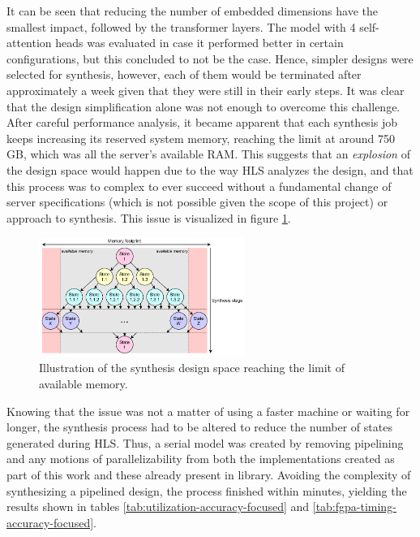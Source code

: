 It can be seen that reducing the number of embedded dimensions have the smallest impact, followed by the transformer layers. The model with 4 self-attention heads was evaluated in case it performed better in certain configurations, but this concluded to not be the case. Hence, simpler designs were selected for synthesis, however, each of them would be terminated after approximately a week given that they were still in their early steps. It was clear that the design simplification alone was not enough to overcome this challenge. After careful performance analysis, it became apparent that each synthesis job keeps increasing its reserved system memory, reaching the limit at around 750 GB, which was all the server's available RAM. This suggests that an \textit{explosion} of the design space would happen due to the way HLS analyzes the design, and that this process was to complex to ever succeed without a fundamental change of server specifications (which is not possible given the scope of this project) or approach to synthesis. This issue is visualized in figure \ref{fig:state-space-explosion}. 

\begin{figure}[hpt!]
  \centering
  \includegraphics[trim={0cm 0cm 0cm 0cm}, clip, width=0.6\textwidth, center]{evaluation/state_space_explosion.pdf}
  \caption{Illustration of the synthesis design space reaching the limit of available memory.}
  \label{fig:state-space-explosion}
\end{figure}

Knowing that the issue was not a matter of using a faster machine or waiting for longer, the synthesis process had to be altered to reduce the number of states generated during HLS. Thus, a serial model was created by removing pipelining and any motions of parallelizability from both the implementations created as part of this work and these already present in \hlsml library. Avoiding the complexity of synthesizing a pipelined design, the process finished within minutes, yielding the results shown in tables \ref{tab:utilization-accuracy-focused} and \ref{tab:fgpa-timing-accuracy-focused}.

